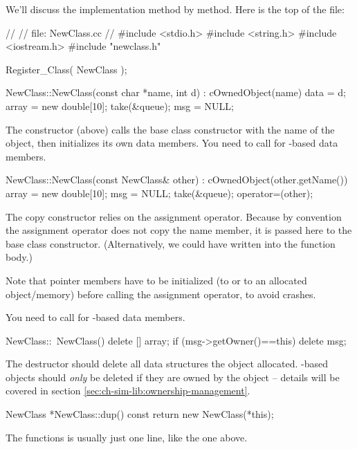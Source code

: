We'll discuss the implementation method by method.
Here is the top of the  file:

\begin{cpp}
//
// file: NewClass.cc
//
#include <stdio.h>
#include <string.h>
#include <iostream.h>
#include "newclass.h"

Register_Class( NewClass );


NewClass::NewClass(const char *name, int d) : cOwnedObject(name)
{
    data = d;
    array = new double[10];
    take(&queue);
    msg = NULL;
}
\end{cpp}

The constructor (above) calls the base class constructor with
the name of the object, then initializes its own data members.
You need to call  for -based data members.


\begin{cpp}
NewClass::NewClass(const NewClass& other) : cOwnedObject(other.getName())
{
    array = new double[10];
    msg = NULL;
    take(&queue);
    operator=(other);
}
\end{cpp}

The copy constructor relies on the assignment operator. Because
by convention the assignment operator does not copy the
name member, it is passed here to the base class constructor.
(Alternatively, we could have written 
into the function body.)

Note that pointer members have to be initialized (to  or to an
allocated object/memory) before calling the assignment operator,
to avoid crashes.

You need to call  for -based data members.

\begin{cpp}
NewClass::~NewClass()
{
    delete [] array;
    if (msg->getOwner()==this)
        delete msg;
}
\end{cpp}

The destructor should delete all data structures the object allocated.
-based objects should \textit{only} be deleted if they
are owned by the object -- details will be covered in section
\ref{sec:ch-sim-lib:ownership-management}.

\begin{cpp}
NewClass *NewClass::dup() const
{
    return new NewClass(*this);
}
\end{cpp}

The  functions is usually just one line, like the one above.

